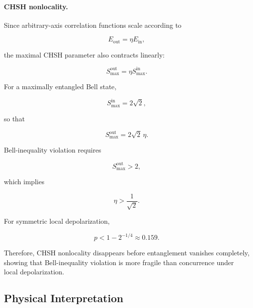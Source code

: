 \paragraph{CHSH nonlocality.}

Since arbitrary-axis correlation functions scale according to

\[
E_{\mathrm{out}}
=
\eta
E_{\mathrm{in}},
\]

the maximal CHSH parameter also contracts linearly:

\begin{equation}
S_{\max}^{\mathrm{out}}
=
\eta
S_{\max}^{\mathrm{in}}.
\label{eq:composite_channel_chsh}
\end{equation}

For a maximally entangled Bell state,

\[
S_{\max}^{\mathrm{in}}
=
2\sqrt{2},
\]

so that

\begin{equation}
S_{\max}^{\mathrm{out}}
=
2\sqrt{2}\,\eta.
\end{equation}

Bell-inequality violation requires

\begin{equation}
S_{\max}^{\mathrm{out}}
>
2,
\end{equation}

which implies

\begin{equation}
\eta
>
\frac{1}{\sqrt{2}}.
\label{eq:chsh_threshold_eta}
\end{equation}

For symmetric local depolarization,

\begin{equation}
p
<
1-2^{-1/4}
\approx
0.159.
\end{equation}

Therefore, CHSH nonlocality disappears before entanglement vanishes completely, showing that Bell-inequality violation is more fragile than concurrence under local depolarization.

\medskip


\subsection{Physical Interpretation}

